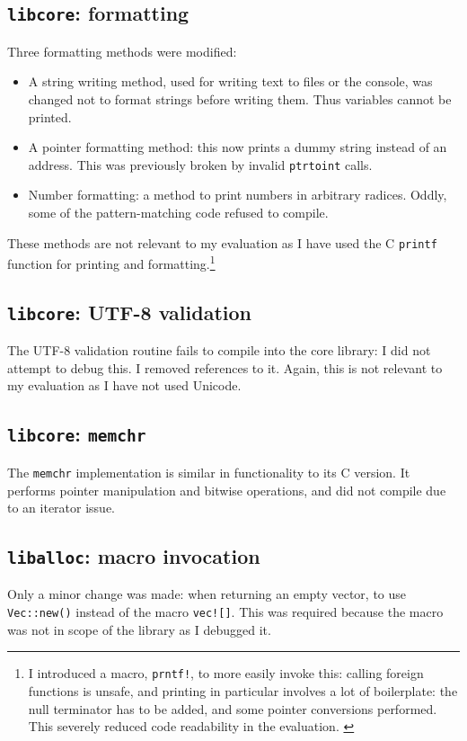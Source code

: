 \documentclass[dissertation.tex]{subfiles}
\begin{document}
\subsection{\texttt{libcore}: formatting}
Three formatting methods were modified:

\begin{itemize}
    \item A string writing method, used for writing text to files or the
    console, was changed not to format strings before writing them.
    Thus variables cannot be printed.
    \item A pointer formatting method: this now prints a dummy string
    instead of an address.
    This was previously broken by invalid \texttt{ptrtoint} calls.
    \item Number formatting: a method to print numbers in arbitrary
    radices.
    Oddly, some of the pattern-matching code refused to compile.
\end{itemize}

These methods are not relevant to my evaluation as I have used the C
\texttt{printf} function for printing and formatting.\footnote{
I introduced a macro, \texttt{prntf!}, to more easily invoke this:
calling foreign functions is unsafe, and printing in particular involves
a lot of boilerplate: the null terminator has to be added, and some
pointer conversions performed.
This severely reduced code readability in the evaluation.
\label{foot:prntf}
}


\subsection{\texttt{libcore}: UTF-8 validation}
The UTF-8 validation routine fails to compile into the core library: I
did not attempt to debug this.
I removed references to it.
Again, this is not relevant to my evaluation as I have not used Unicode.


\subsection{\texttt{libcore}: \texttt{memchr}}
The \texttt{memchr} implementation is similar in functionality to its C
version.
It performs pointer manipulation and bitwise operations, and did not
compile due to an iterator issue.


\subsection{\texttt{liballoc}: macro invocation}
Only a minor change was made: when returning an empty vector, to use
\texttt{Vec::new()} instead of the macro \texttt{vec![]}.
This was required because the macro was not in scope of the library as I
debugged it.
\end{document}
